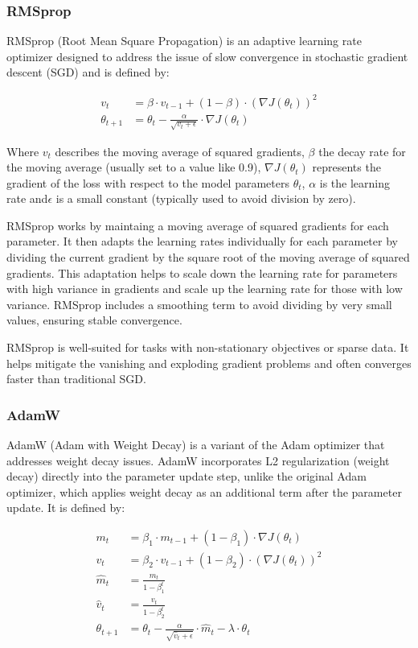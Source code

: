 \subsubsection{RMSprop}

RMSprop (Root Mean Square Propagation) is an adaptive learning rate optimizer designed to address the issue of slow convergence in stochastic gradient descent (SGD) and is defined by:


\begin{align}
	v_t &= \beta \cdot v_{t-1} + (1 - \beta) \cdot (\nabla J(\theta_t))^2 
	\\
	\theta_{t+1} &= \theta_t - \frac{\alpha}{\sqrt{v_t + \epsilon}} \cdot \nabla J(\theta_t)
\end{align}    

Where \(v_t\) describes the moving average of squared gradients, \(\beta\) the decay rate for the moving average (usually set to a value like 0.9), \(\nabla J(\theta_t)\) represents the gradient of the loss with respect to the model parameters \(\theta_t\), \(\alpha\) is the learning rate and\(\epsilon\) is a small constant (typically used to avoid division by zero).

RMSprop works by maintaing a moving average of squared gradients for each parameter. It then adapts the learning rates individually for each parameter by dividing the current gradient by the square root of the moving average of squared gradients.
This adaptation helps to scale down the learning rate for parameters with high variance in gradients and scale up the learning rate for those with low variance.
RMSprop includes a smoothing term to avoid dividing by very small values, ensuring stable convergence.

RMSprop is well-suited for tasks with non-stationary objectives or sparse data. It helps mitigate the vanishing and exploding gradient problems and often converges faster than traditional SGD.

\subsubsection{AdamW}

AdamW (Adam with Weight Decay) is a variant of the Adam optimizer that addresses weight decay issues. AdamW incorporates L2 regularization (weight decay) directly into the parameter update step, unlike the original Adam optimizer, which applies weight decay as an additional term after the parameter update. It is defined by:

\begin{align}
	m_t &= \beta_1 \cdot m_{t-1} + (1 - \beta_1) \cdot \nabla J(\theta_t) \\
	v_t &= \beta_2 \cdot v_{t-1} + (1 - \beta_2) \cdot (\nabla J(\theta_t))^2 \\
	\hat{m}_t &= \frac{m_t}{1 - \beta_1^t} \\
	\hat{v}_t &= \frac{v_t}{1 - \beta_2^t} \\
	\theta_{t+1} &= \theta_t - \frac{\alpha}{\sqrt{\hat{v}_t + \epsilon}} \cdot \hat{m}_t - \lambda \cdot \theta_t
\end{align}

